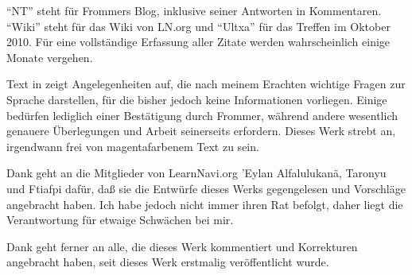 "`NT"' steht f\"ur Frommers Blog, inklusive seiner Antworten in Kommentaren.
"`Wiki"' steht f\"ur das Wiki von LN.org und "`Ultxa"' f\"ur das Treffen im
Oktober 2010. F\"ur eine vollst\"andige Erfassung aller Zitate werden
wahrscheinlich einige Monate vergehen.

Text in  zeigt Angelegenheiten auf, die nach meinem Erachten
wichtige Fragen zur Sprache darstellen, f\"ur die bisher jedoch keine Informationen
vorliegen. Einige bed\"urfen lediglich einer Best\"atigung durch Frommer, w\"ahrend
andere wesentlich genauere \"Uberlegungen und Arbeit seinerseits erfordern. Dieses
Werk strebt an, irgendwann frei von magentafarbenem Text zu sein.

\bigskip

\bigskip
Dank geht an die Mitglieder von LearnNavi.org ’Eylan Alfalulukan\"a,
Taronyu und Ftiafpi daf\"ur, da\ss{} sie die Entw\"urfe dieses Werks gegengelesen
und Vorschl\"age angebracht haben. Ich habe jedoch nicht immer ihren Rat befolgt,
daher liegt die Verantwortung f\"ur etwaige Schw\"achen bei mir.

Dank geht ferner an alle, die dieses Werk kommentiert und Korrekturen angebracht
haben, seit dieses Werk erstmalig ver\"offentlicht wurde.